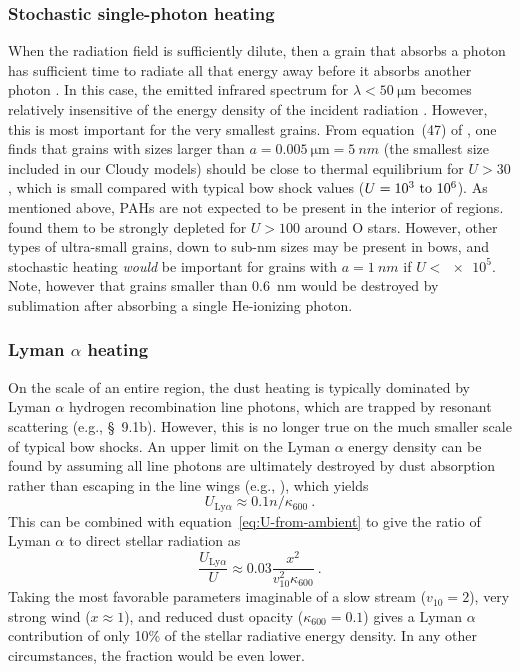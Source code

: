 \documentclass[useAMS, usenatbib, a4paper]{mnras}
\newcommand\Lya{\ensuremath{_{\text{Ly}\alpha}}}
\newcommand\hii{\ion{H}{ii}}
\begin{document}
\subsubsection{Stochastic single-photon heating}
\label{sec:stoch-single-phot}
When the radiation field is sufficiently dilute, then a grain that
absorbs a photon has sufficient time to radiate all that energy away
before it absorbs another photon \citep{Duley:1973a}.  In this case,
the emitted infrared spectrum for \(\lambda < \SI{50}{\um}\) becomes
relatively insensitive of the energy density of the incident radiation
\citep{Draine:2001a}.  However, this is most important for the very
smallest grains.  From equation~(47) of \citet{Draine:2001a}, one
finds that grains with sizes larger than
\(a = \SI{0.005}{\um} = \SI{5}{nm}\) (the smallest size included in
our Cloudy models) should be close to thermal equilibrium for
\(U > 30\), which is small compared with typical bow shock values
(\(U = \text{\numrange{e3}{e6}}\)).  As mentioned above, PAHs are not
expected to be present in the interior of \hii{} regions.
\citealp{Desert:1990a} found them to be strongly depleted for
\(U > 100\) around O stars.  However, other types of ultra-small
grains, down to sub-nm sizes \citep{Xie:2018a} may be present in bows,
and stochastic heating \emph{would} be important for grains with
\(a = \SI{1}{nm}\) if \(U < \num{e5}\).  Note, however that grains
smaller than \SI{0.6}{nm} would be destroyed by sublimation after
absorbing a single He-ionizing photon.


\subsubsection{Lyman \(\alpha\) heating}

On the scale of an entire \hii{} region, the dust heating is typically
dominated by Lyman \(\alpha\) hydrogen recombination line photons, which
are trapped by resonant scattering (e.g., \citealp{Spitzer:1978a}
\S~9.1b).  However, this is no longer true on the much smaller scale
of typical bow shocks.  An upper limit on the Lyman \(\alpha\) energy
density can be found by assuming all line photons are ultimately
destroyed by dust absorption rather than escaping in the line wings
(e.g., \citealp{Henney:1998b}), which yields
\begin{equation}
  \label{eq:U-Lya}
  U\Lya \approx 0.1 n / \kappa_{600} \ .
\end{equation}
This can be combined with equation~\eqref{eq:U-from-ambient} to give
the ratio of Lyman \(\alpha\) to direct stellar radiation as
\begin{equation}
  \label{eq:Lya-over-stellar}
  \frac{U\Lya}{U} \approx 0.03 \frac{x^2}{v_{10}^2 \kappa_{600}} \ .
\end{equation}
Taking the most favorable parameters imaginable of a slow stream
(\(v_{10} = 2\)), very strong wind (\(x \approx 1\)), and reduced dust
opacity (\(\kappa_{600} = 0.1\)) gives a Lyman \(\alpha\) contribution of only
10\% of the stellar radiative energy density.  In any other
circumstances, the fraction would be even lower.
\end{document}
